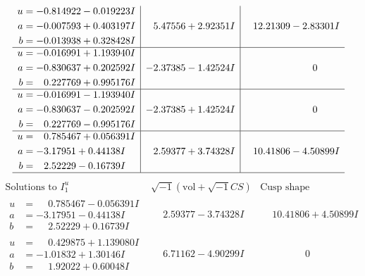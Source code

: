 \documentclass[1p]{elsarticle_modified}
\theoremstyle{definition}
\newcommand{\I}{\sqrt{-1}}
\begin{document}
$$\begin{array}{c|c|c}
\begin{aligned}
u &= -0.814922 - 0.019223 I \\
a &= -0.007593 + 0.403197 I \\
b &= -0.013938 + 0.328428 I\end{aligned}
 & \phantom{-}5.47556 + 2.92351 I & \phantom{-}12.21309 - 2.83301 I \\ \hline\begin{aligned}
u &= -0.016991 + 1.193940 I \\
a &= -0.830637 + 0.202592 I \\
b &= \phantom{-}0.227769 + 0.995176 I\end{aligned}
 & -2.37385 - 1.42524 I & \phantom{-0.000000 } 0 \\ \hline\begin{aligned}
u &= -0.016991 - 1.193940 I \\
a &= -0.830637 - 0.202592 I \\
b &= \phantom{-}0.227769 - 0.995176 I\end{aligned}
 & -2.37385 + 1.42524 I & \phantom{-0.000000 } 0 \\ \hline\begin{aligned}
u &= \phantom{-}0.785467 + 0.056391 I \\
a &= -3.17951 + 0.44138 I \\
b &= \phantom{-}2.52229 - 0.16739 I\end{aligned}
 & \phantom{-}2.59377 + 3.74328 I & \phantom{-}10.41806 - 4.50899 I\\
 \hline 
 \end{array}$$\newpage$$\begin{array}{c|c|c}  
\text{Solutions to }I^u_{1}& \I (\text{vol} + \sqrt{-1}CS) & \text{Cusp shape}\\
 \hline 
\begin{aligned}
u &= \phantom{-}0.785467 - 0.056391 I \\
a &= -3.17951 - 0.44138 I \\
b &= \phantom{-}2.52229 + 0.16739 I\end{aligned}
 & \phantom{-}2.59377 - 3.74328 I & \phantom{-}10.41806 + 4.50899 I \\ \hline\begin{aligned}
u &= \phantom{-}0.429875 + 1.139080 I \\
a &= -1.01832 + 1.30146 I \\
b &= \phantom{-}1.92022 + 0.60048 I\end{aligned}
 & \phantom{-}6.71162 - 4.90299 I & \phantom{-0.000000 } 0 \\ \hline\begin{aligned}

\end{aligned}
\end{array}$$
\end{document}
